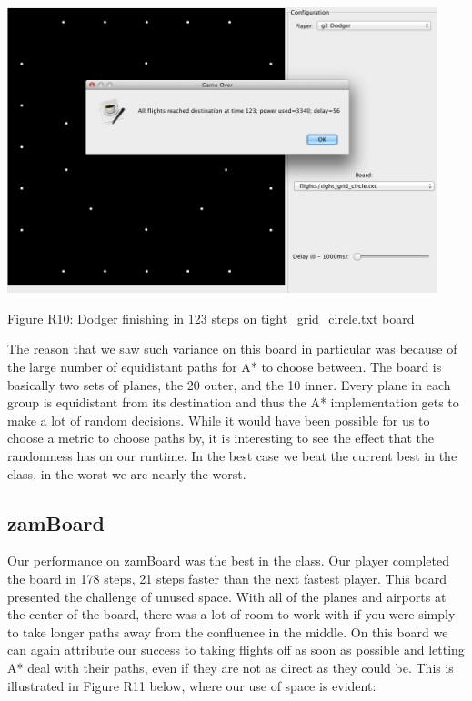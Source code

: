 \documentclass[10pt]{article}
\begin{document}
\includegraphics[width=125mm]{pics/R10.png}
\caption{Figure R10: Dodger finishing in 123 steps on tight_grid_circle.txt board}

The reason that we saw such variance on this board in particular was because of the large number of equidistant paths for A* to choose between. The board is basically two sets of planes, the 20 outer, and the 10 inner. Every plane in each group is equidistant from its destination and thus the A* implementation gets to make a lot of random decisions. While it would have been possible for us to choose a metric to choose paths by, it is interesting to see the effect that the randomness has on our runtime. In the best case we beat the current best in the class, in the worst we are nearly the worst.

\subsection{zamBoard}

Our performance on zamBoard was the best in the class. Our player completed the board in 178 steps, 21 steps faster than the next fastest player. This board presented the challenge of unused space. With all of the planes and airports at the center of the board, there was a lot of room to work with if you were simply to take longer paths away from the confluence in the middle. On this board we can again attribute our success to taking flights off as soon as possible and letting A* deal with their paths, even if they are not as direct as they could be. This is illustrated in Figure R11 below, where our use of space is evident:
\end{document}
